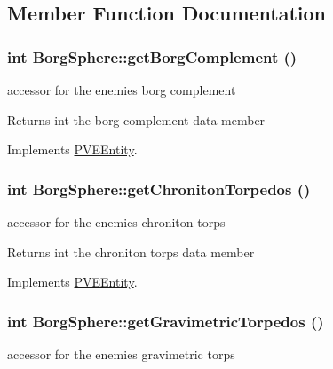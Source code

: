 \subsection{Member Function Documentation}
\hypertarget{classBorgSphere_a93dea9d86166e31a47bcce6f57d31b22}{
\subsubsection[{getBorgComplement}]{\setlength{\rightskip}{0pt plus 5cm}int BorgSphere::getBorgComplement ()}}
\label{d6/ddd/classBorgSphere_a93dea9d86166e31a47bcce6f57d31b22}
accessor for the enemies borg complement

\begin{DoxyReturn}{Returns}
int the borg complement data member 
\end{DoxyReturn}


Implements \hyperlink{classPVEEntity}{PVEEntity}.

\hypertarget{classBorgSphere_a2db684357bc18ffcefcb122e70b1034e}{
\subsubsection[{getChronitonTorpedos}]{\setlength{\rightskip}{0pt plus 5cm}int BorgSphere::getChronitonTorpedos ()}}
\label{d6/ddd/classBorgSphere_a2db684357bc18ffcefcb122e70b1034e}
accessor for the enemies chroniton torps

\begin{DoxyReturn}{Returns}
int the chroniton torps data member 
\end{DoxyReturn}


Implements \hyperlink{classPVEEntity}{PVEEntity}.

\hypertarget{classBorgSphere_ab6be228e635612baa31385b5f9b7b4f6}{
\subsubsection[{getGravimetricTorpedos}]{\setlength{\rightskip}{0pt plus 5cm}int BorgSphere::getGravimetricTorpedos ()}}
\label{d6/ddd/classBorgSphere_ab6be228e635612baa31385b5f9b7b4f6}
accessor for the enemies gravimetric torps

